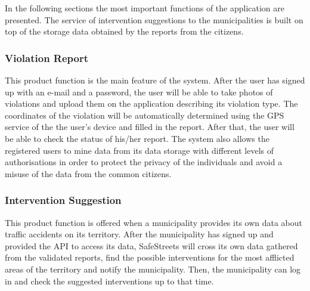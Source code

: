 In the following sections the most important functions of the application are presented. The service of intervention suggestions to the municipalities is built on top of the storage data obtained by the reports from the citizens.
\subsubsection{Violation Report}
This product function is the main feature of the system. After the user has signed up with an e-mail and a password, the user will be able to take photos of violations and upload them on the application describing its violation type. The coordinates of the violation will be automatically determined using the GPS service of the the user's device and filled in the report. After that, the user will be able to check the status of his/her report. The system also allows the registered users to mine data from its data storage with different levels of authorisations in order to protect the privacy of the individuals and avoid a misuse of the data from the common citizens.
\subsubsection{Intervention Suggestion}
This product function is offered when a municipality provides its own data about traffic accidents on its territory. After the municipality has signed up and provided the API to access its data, SafeStreets will cross its own data gathered from the validated reports, find the possible interventions for the most afflicted areas of the territory and notify the municipality. Then, the municipality can log in and check the suggested interventions up to that time.